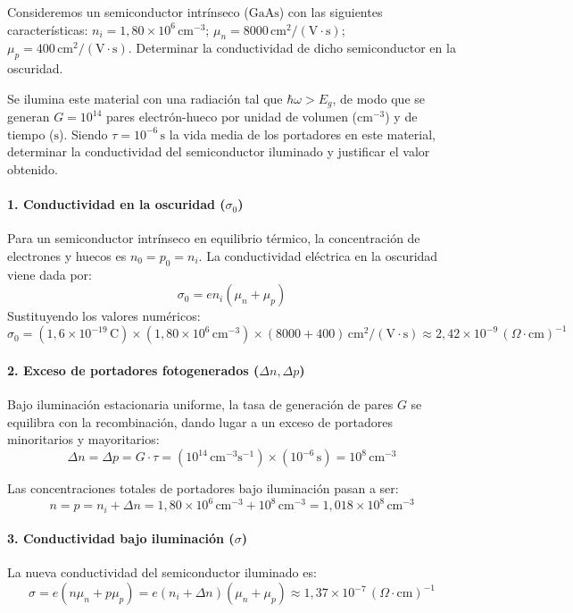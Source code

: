 \newpage
\begin{problema}
Consideremos un semiconductor intrínseco ($\text{GaAs}$) con las siguientes características: $n_i = 1,80 \times 10^6\,\text{cm}^{-3}$; $\mu_n = 8000\,\text{cm}^2/(\text{V}\cdot\text{s})$; $\mu_p = 400\,\text{cm}^2/(\text{V}\cdot\text{s})$. Determinar la conductividad de dicho semiconductor en la oscuridad.

Se ilumina este material con una radiación tal que $\hbar\omega > E_g$, de modo que se generan $G = 10^{14}$ pares electrón-hueco por unidad de volumen ($\text{cm}^{-3}$) y de tiempo ($\text{s}$). Siendo $\tau = 10^{-6}\,\text{s}$ la vida media de los portadores en este material, determinar la conductividad del semiconductor iluminado y justificar el valor obtenido.
\tcblower
\paragraph{1. Conductividad en la oscuridad ($\sigma_0$)}
Para un semiconductor intrínseco en equilibrio térmico, la concentración de electrones y huecos es $n_0 = p_0 = n_i$. La conductividad eléctrica en la oscuridad viene dada por:
\[
\sigma_0 = e n_i (\mu_n + \mu_p)
\]
Sustituyendo los valores numéricos:
\[
\sigma_0 = (1,6 \times 10^{-19}\,\text{C}) \times (1,80 \times 10^6\,\text{cm}^{-3}) \times (8000 + 400)\,\text{cm}^2/(\text{V}\cdot\text{s}) \approx 2,42 \times 10^{-9}\,(\Omega\cdot\text{cm})^{-1}
\]

\paragraph{2. Exceso de portadores fotogenerados ($\Delta n, \Delta p$)}
Bajo iluminación estacionaria uniforme, la tasa de generación de pares $G$ se equilibra con la recombinación, dando lugar a un exceso de portadores minoritarios y mayoritarios:
\[
\Delta n = \Delta p = G \cdot \tau = (10^{14}\,\text{cm}^{-3}\text{s}^{-1}) \times (10^{-6}\,\text{s}) = 10^8\,\text{cm}^{-3}
\]

Las concentraciones totales de portadores bajo iluminación pasan a ser:
\[
n = p = n_i + \Delta n = 1,80 \times 10^6\,\text{cm}^{-3} + 10^8\,\text{cm}^{-3} = 1,018 \times 10^8\,\text{cm}^{-3}
\]

\paragraph{3. Conductividad bajo iluminación ($\sigma$)}
La nueva conductividad del semiconductor iluminado es:
\[
\sigma = e (n \mu_n + p \mu_p) = e (n_i + \Delta n)(\mu_n + \mu_p) \approx 1,37 \times 10^{-7}\,(\Omega\cdot\text{cm})^{-1}
\]


\end{problema}
